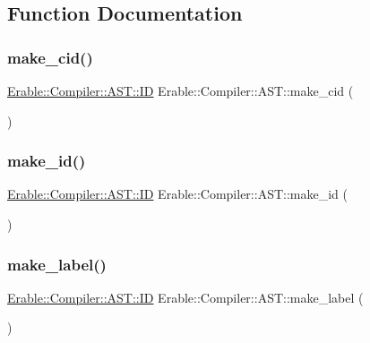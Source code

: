 \subsection{Function Documentation}
\mbox{\label{namespace_erable_1_1_compiler_1_1_a_s_t_ae083e7b298be9dda627723fe87519165}} 
\subsubsection{\texorpdfstring{make\_cid()}{make\_cid()}}
{\footnotesize\ttfamily \mbox{\hyperlink{struct_erable_1_1_compiler_1_1_a_s_t_1_1_i_d}{Erable\+::\+Compiler\+::\+A\+S\+T\+::\+ID}} Erable\+::\+Compiler\+::\+A\+S\+T\+::make\+\_\+cid (\begin{DoxyParamCaption}{ }\end{DoxyParamCaption})}

\mbox{\label{namespace_erable_1_1_compiler_1_1_a_s_t_a7790575979d6ca1f532411a34a179746}} 
\subsubsection{\texorpdfstring{make\_id()}{make\_id()}}
{\footnotesize\ttfamily \mbox{\hyperlink{struct_erable_1_1_compiler_1_1_a_s_t_1_1_i_d}{Erable\+::\+Compiler\+::\+A\+S\+T\+::\+ID}} Erable\+::\+Compiler\+::\+A\+S\+T\+::make\+\_\+id (\begin{DoxyParamCaption}{ }\end{DoxyParamCaption})}

\mbox{\label{namespace_erable_1_1_compiler_1_1_a_s_t_a3ad5e62c30381df13fcc0c9c01674fb5}} 
\subsubsection{\texorpdfstring{make\_label()}{make\_label()}}
{\footnotesize\ttfamily \mbox{\hyperlink{struct_erable_1_1_compiler_1_1_a_s_t_1_1_i_d}{Erable\+::\+Compiler\+::\+A\+S\+T\+::\+ID}} Erable\+::\+Compiler\+::\+A\+S\+T\+::make\+\_\+label (\begin{DoxyParamCaption}{ }\end{DoxyParamCaption})}

